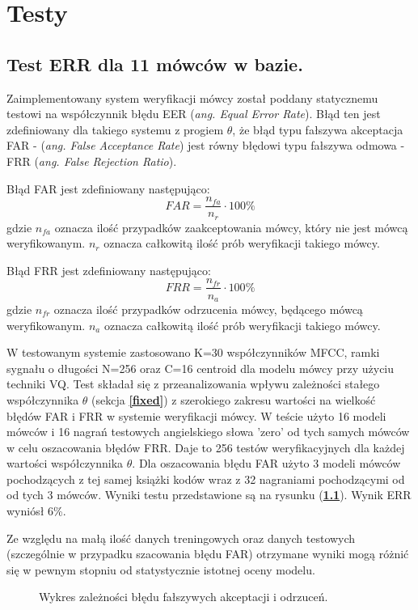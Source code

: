 \chapter{Testy}

\section{Test ERR dla 11 mówców w bazie.}

Zaimplementowany system weryfikacji mówcy został poddany statycznemu testowi na współczynnik błędu EER (\textit{ang. Equal Error Rate}). Błąd ten jest zdefiniowany dla takiego systemu z progiem $\theta$, że błąd typu fałszywa akceptacja FAR - (\textit{ang. False Acceptance Rate}) jest równy błędowi typu fałszywa odmowa - FRR (\textit{ang. False Rejection Ratio}).

\label{err}

Błąd FAR jest zdefiniowany następująco:
  \begin{equation}
  FAR = \frac{n_{fa}}{n_r} \cdot 100\%
  \end{equation}
  gdzie $n_{fa}$ oznacza ilość przypadków zaakceptowania mówcy, który nie jest mówcą weryfikowanym. $n_{r}$ oznacza całkowitą ilość prób weryfikacji takiego mówcy.

Błąd FRR jest zdefiniowany następująco:
  \begin{equation}
  FRR = \frac{n_{fr}}{n_a} \cdot 100\%
  \end{equation}
  gdzie $n_{fr}$ oznacza ilość przypadków odrzucenia mówcy, będącego mówcą weryfikowanym. $n_{a}$ oznacza całkowitą ilość prób weryfikacji takiego mówcy.


W testowanym systemie zastosowano K=30 współczynników MFCC, ramki sygnału o długości N=256 oraz C=16 centroid dla modelu mówcy przy użyciu techniki VQ. Test składał się z przeanalizowania wpływu zależności stałego współczynnika $\theta$ (sekcja \textbf{\ref{fixed}}) z szerokiego zakresu wartości na wielkość błędów FAR i FRR w systemie weryfikacji mówcy. W teście użyto 16 modeli mówców i 16 nagrań testowych angielskiego słowa 'zero' od tych samych mówców w celu oszacowania błędów FRR. Daje to 256 testów weryfikacyjnych dla każdej wartości współczynnika $\theta$. Dla oszacowania błędu FAR użyto 3 modeli mówców pochodzących z tej samej książki kodów wraz z 32 nagraniami pochodzącymi od od tych 3 mówców. Wyniki testu przedstawione są na rysunku (\textbf{\ref{fig:err}}). Wynik ERR wyniósł 6\%.

Ze względu na małą ilość danych treningowych oraz danych testowych (szczególnie w przypadku szacowania błędu FAR) otrzymane wyniki mogą różnić się w pewnym stopniu od statystycznie istotnej oceny modelu.


\begin{figure}[t]
  \centering
    
    \caption{\label{fig:err} Wykres zależności błędu fałszywych akceptacji i odrzuceń.}
\end{figure}
